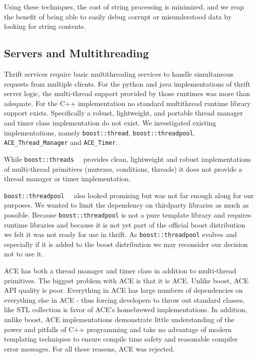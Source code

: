 \documentclass[nocopyrightspace,blockstyle]{sigplanconf}
\begin{document}
Using these techniques, the cost of string processing is minimized, and we
reap the benefit of being able to easily debug corrupt or misunderstood data by
looking for string contents.

\subsection{Servers and Multithreading}
Thrift services require basic multithreading services to handle simultaneous
requests from multiple clients.  For the python and java implementations of
thrift server logic, the multi-thread support provided by those runtimes was more
than adequate.  For the C++ implementation no standard multithread runtime
library support exists.  Specifically a robust, lightweight, and portable 
thread manager and timer class implementation do not exist.  We investigated
existing implementations, namely {\tt boost::thread}, 
{\tt boost::threadpool}, {\tt ACE\_Thread\_Manager} and {\tt ACE\_Timer}.  

While {\tt boost::threads \cite{boost.threads} } provides clean, lightweight and
robust implementations of multi-thread primitives (mutexes, conditions, threads)
 it does not provide a thread manager or timer implementation.  

{\tt boost::threadpool \cite{boost.threadpool} } also looked promising but was not
far enough along for our purposes.  We wanted to limit the dependency on
thirdparty libraries as much as possible.  Because {\tt boost::threadpool} is not
a pure template library and requires runtime libraries and because it is not yet
part of the official boost distribution we felt it was not ready for use in thrift.
As {\tt boost::threadpool} evolves and especially if it is added to the boost
distribution we may reconsider our decision not to use it.

ACE has both a thread manager and timer class in addition to multi-thread
primitives.  The biggest problem with ACE is that it is ACE.  Unlike boost, ACE
API quality is poor.  Everything in ACE has large numbers of dependencies on
everything else in ACE - thus forcing developers to throw out standard classes, 
like STL collection is favor of ACE's homebrewed implementations.  In addition,
unlike boost, ACE implementations demonstrate little understanding of the power
and pitfalls of C++ programming and take no advantage of modern templating
techniques to ensure compile time safety and reasonable compiler error messages.  
For all these reasons, ACE was rejected.
\end{document}
